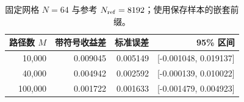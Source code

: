 \begin{table}[H]\centering\small
\caption{固定网格 $N=64$ 与参考 $N_{\rm ref}=8192$；使用保存样本的嵌套前缀。}
\begin{tabular}{rrrr}\toprule
路径数 $M$ & 带符号收益差 & 标准误差 & 95\% 区间\\\midrule
10,000 & 0.009045 & 0.005149 & [-0.001048, 0.019137]\\
40,000 & 0.004942 & 0.002592 & [-0.000139, 0.010022]\\
100,000 & 0.001722 & 0.001633 & [-0.001479, 0.004923]\\
\bottomrule\end{tabular}
\end{table}
